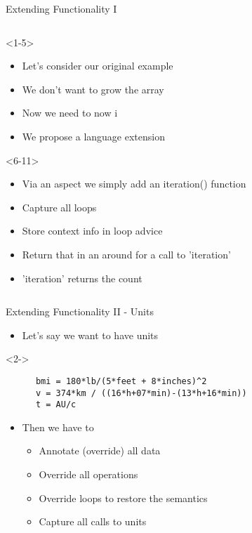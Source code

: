 \begin{frame}[fragile,t]{Extending Functionality I}
\begin{columns}[T]
      \begin{column}{5cm}
        \begin{onlyenv}<1-5>
          \begin{itemize}
          \item<1-5> Let's consider our original example
          \item<2-5> We don't want to grow the array
          \item<4-5> Now we need to now i
          \item<5> We propose a language extension 
          \end{itemize}
        \end{onlyenv}
        \begin{onlyenv}<6-11>
          \begin{itemize}
          \item<6-> Via an aspect we simply add an iteration() function
          \item<7-> Capture all loops
          \item<8-> Store context info in loop advice 
           \item<9-> Return that in an around for a call to 'iteration'
          \item<10> 'iteration' returns the count
          \end{itemize}
        \end{onlyenv}
    \end{column}
  \end{columns}
\end{frame}




\begin{frame}[fragile,t]{Extending Functionality II - Units}
  \begin{itemize}
  \item Let's say we want to have units
  \end{itemize}
  \begin{onlyenv}<2->
    \begin{Verbatim}
      bmi = 180*lb/(5*feet + 8*inches)^2
      v = 374*km / ((16*h+07*min)-(13*h+16*min))
      t = AU/c
    \end{Verbatim}
  \end{onlyenv}
  \begin{itemize}
    \pause
    \pause \item Then we have to
    \begin{itemize}
      \pause \item Annotate (override) all data
      \pause \item Override all operations
      \pause \item Override loops to restore the semantics
      \pause \item Capture all calls to units
    \end{itemize}
  \end{itemize}
\end{frame}


